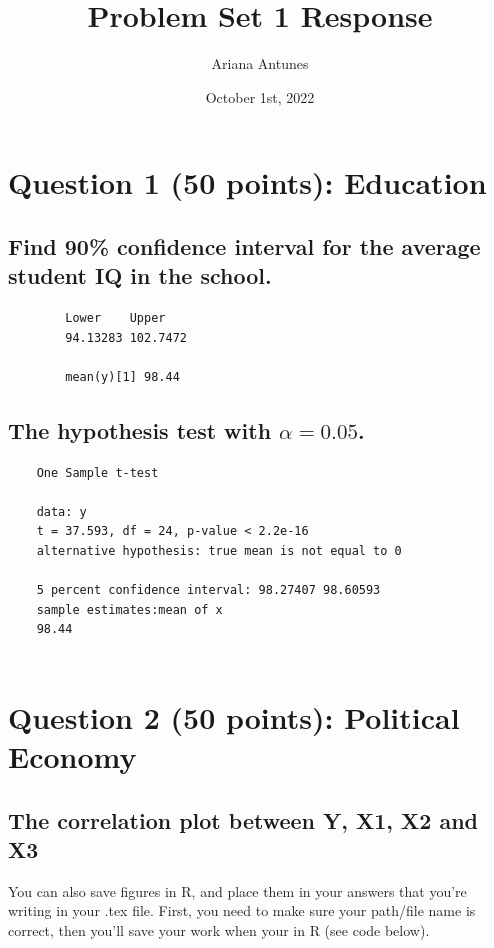 \documentclass[12pt,letterpaper]{article}
\title{ Problem Set 1 Response}
\date{October 1st, 2022}
\author{Ariana Antunes}
\begin{document}
	\maketitle
	
\section*{Question 1 (50 points): Education}

\subsection*{Find 90\% confidence interval for the average student IQ in the school.}

  

\begin{verbatim}
	    Lower    Upper 
	    94.13283 102.7472
	    
	    mean(y)[1] 98.44

\end{verbatim}

\subsection*{The hypothesis test with $\alpha=0.05$.} 

  

\begin{verbatim}
	One Sample t-test 
	
	data: y
	t = 37.593, df = 24, p-value < 2.2e-16
	alternative hypothesis: true mean is not equal to 0
	
	5 percent confidence interval: 98.27407 98.60593
	sample estimates:mean of x     
	98.44 
	
\end{verbatim}

\newpage


\section{Question 2 (50 points): Political Economy}

\subsection*{The correlation plot between Y, X1, X2 and X3} 

\noindent You can also save figures in R, and place them in your answers that you're writing in your .tex file. First, you need to make sure your path/file name is correct, then you'll save your work when your in R (see code below).
\end{document}
